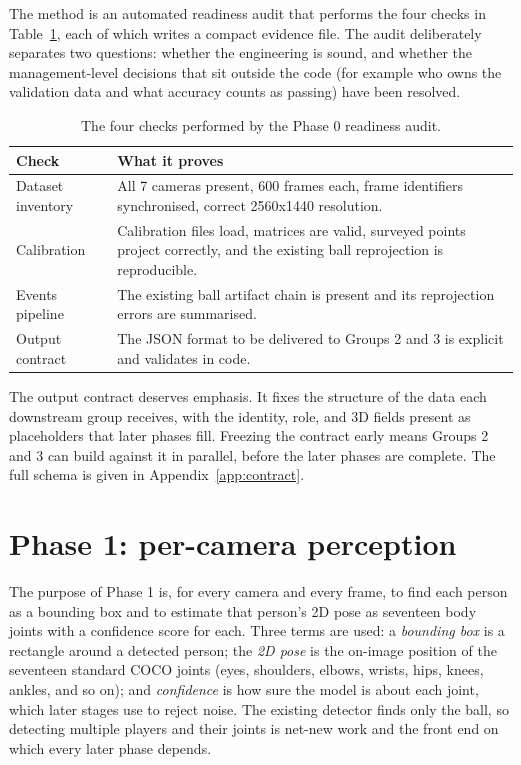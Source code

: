 \documentclass[oneside,openany]{book}
\begin{document}
The method is an automated readiness audit that performs the four checks in
Table~\ref{tab:phase0}, each of which writes a compact evidence file. The audit deliberately
separates two questions: whether the engineering is sound, and whether the management-level
decisions that sit outside the code (for example who owns the validation data and what accuracy
counts as passing) have been resolved.

\begin{table}[!h]
	\begin{center}
		\caption{The four checks performed by the Phase 0 readiness audit.}
		\label{tab:phase0}
		\footnotesize
		\begin{tabular}{p{3.0cm}p{11.0cm}}
			\toprule
			\textbf{Check} & \textbf{What it proves} \\
			\midrule
			Dataset inventory & All 7 cameras present, 600 frames each, frame identifiers
			synchronised, correct 2560x1440 resolution. \\
			Calibration & Calibration files load, matrices are valid, surveyed points project
			correctly, and the existing ball reprojection is reproducible. \\
			Events pipeline & The existing ball artifact chain is present and its reprojection
			errors are summarised. \\
			Output contract & The JSON format to be delivered to Groups 2 and 3 is explicit and
			validates in code. \\
			\bottomrule
		\end{tabular}
	\end{center}
\end{table}

The output contract deserves emphasis. It fixes the structure of the data each downstream group
receives, with the identity, role, and 3D fields present as placeholders that later phases fill.
Freezing the contract early means Groups 2 and 3 can build against it in parallel, before the
later phases are complete. The full schema is given in Appendix~\ref{app:contract}.

\section{Phase 1: per-camera perception}
The purpose of Phase 1 is, for every camera and every frame, to find each person as a bounding
box and to estimate that person's 2D pose as seventeen body joints with a confidence score for
each. Three terms are used: a \emph{bounding box} is a rectangle around a detected person; the
\emph{2D pose} is the on-image position of the seventeen standard COCO joints (eyes, shoulders,
elbows, wrists, hips, knees, ankles, and so on); and \emph{confidence} is how sure the model is
about each joint, which later stages use to reject noise. The existing detector finds only the
ball, so detecting multiple players and their joints is net-new work and the front end on which
every later phase depends.
\end{document}
